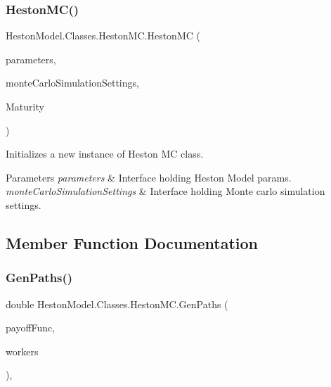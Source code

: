 \subsubsection{\texorpdfstring{Heston\+M\+C()}{HestonMC()}}
{\footnotesize\ttfamily Heston\+Model.\+Classes.\+Heston\+M\+C.\+Heston\+MC (\begin{DoxyParamCaption}\item[{\mbox{\hyperlink{class_heston_model_1_1_classes_1_1_interface_classes_1_1_heston_model_parameters}{Heston\+Model\+Parameters}}}]{parameters,  }\item[{\mbox{\hyperlink{class_heston_model_1_1_classes_1_1_interface_classes_1_1_monte_carlo_settings}{Monte\+Carlo\+Settings}}}]{monte\+Carlo\+Simulation\+Settings,  }\item[{double}]{Maturity }\end{DoxyParamCaption})\hspace{0.3cm}{\ttfamily [inline]}}



Initializes a new instance of Heston MC class. 


\begin{DoxyParams}{Parameters}
{\em parameters} & Interface holding Heston Model params.\\
\hline
{\em monte\+Carlo\+Simulation\+Settings} & Interface holding Monte carlo simulation settings.\\
\hline
\end{DoxyParams}


\subsection{Member Function Documentation}
\mbox{\label{class_heston_model_1_1_classes_1_1_heston_m_c_a726e96a32d76424524bb5bfda783e356}} 
\subsubsection{\texorpdfstring{Gen\+Paths()}{GenPaths()}}
{\footnotesize\ttfamily double Heston\+Model.\+Classes.\+Heston\+M\+C.\+Gen\+Paths (\begin{DoxyParamCaption}\item[{Func$<$ double\mbox{[}$\,$\mbox{]}, double $>$}]{payoff\+Func,  }\item[{int}]{workers }\end{DoxyParamCaption})\hspace{0.3cm}{\ttfamily [inline]}, {\ttfamily [protected]}}



